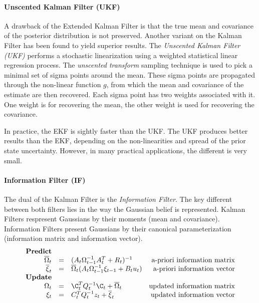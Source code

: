 \paragraph{Unscented Kalman Filter (UKF)}
A drawback of the Extended Kalman Filter is that the true mean and covariance of the posterior distribution is not preserved.
Another variant on the Kalman Filter has been found to yield superior results.
The \textit{Unscented Kalman Filter (UKF)} performs a stochastic linearization using a weighted statistical linear regression process.
The \textit{unscented transform} sampling technique is used to pick a minimal set of sigma points around the mean.
These sigma points are propagated through the non-linear function $g$, from which the mean and covariance of the estimate are then recovered.
Each sigma point has two weights associated with it. One weight is for recovering the mean, the other weight is used for recovering the covariance.

In practice, the EKF is sightly faster than the UKF.
The UKF produces better results than the EKF, depending on the non-linearities and spread of the prior state uncertainty.
However, in many practical applications, the different is very small.


\paragraph{Information Filter (IF)}
The dual of the Kalman Filter is the \textit{Information Filter}.
The key different between both filters lies in the way the Gaussian belief is represented.
Kalman Filters respresent Gaussians by their moments (mean and covariance).
Information Filters present Gaussians by their canonical parameterization (information matrix and information vector).
\begin{equation}
\label{eq:KF}
\begin{array}{rclr}
\text{\textbf{Predict}} \\
\overline{\Omega}_t & = & (A_t \Omega_{t-1}^{-1} A_t^T + R_t)^{-1}  & \text{a-priori information matrix} \\
\overline{\xi}_t & = & \overline{\Omega}_t ( A_t \Omega_{t-1}^{-1} \xi_{t-1} + B_t u_t )  & \text{a-priori information vector} \\
\text{\textbf{Update}} \\
\Omega_t & = & \C_t^T Q_t^{-1} \C_t + \overline{\Omega}_t & \text{updated information matrix} \\
\xi_t & = & C_t^T Q_t^{-1} z_t + \overline{\xi}_t & \text{updated information vector}
\end{array}
\end{equation}

